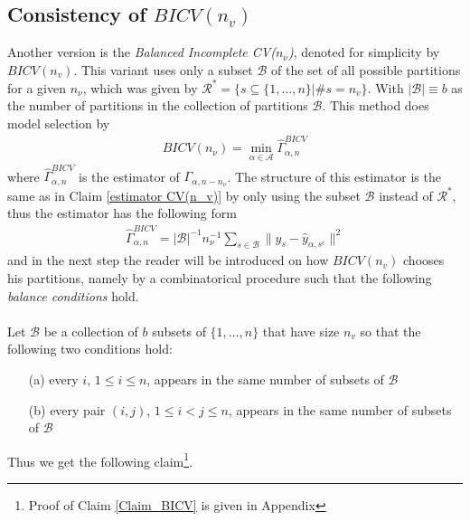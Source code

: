 \documentclass[Research_Module_ES.tex]{subfiles}
\begin{document}
\subsection{Consistency of $BICV(n_v)$}
Another version is the \textit{Balanced Incomplete CV($n_\nu$)}, denoted for simplicity by $BICV(n_v)$. This variant uses only a subset $\mathcal{B}$ of the set of all possible partitions for a given $n_\nu$, which was given by $\mathcal{R}^\ast= \{s\subseteq\{1,\dots,n\}|\# s=n_v\}$. With $|\mathcal{B}|\equiv b$ as the number of partitions in the collection of partitions $\mathcal{B}$. This method does model selection by 
\begin{align*}
	BICV(n_\nu)=\min_{\alpha\in\mathcal{A}}\hat{\Gamma}_{\alpha,n}^{BICV}
\end{align*}
where $\hat{\Gamma}_{\alpha,n}^{BICV}$ is the estimator of $\Gamma_{\alpha,n-n_\nu}$. The structure of this estimator is the same as in Claim \ref{estimator CV(n_v)} by only using the subset $\mathcal{B}$ instead of $\mathcal{R}^\ast$, thus the estimator has the following form
\begin{align*}
	\hat{\Gamma}_{\alpha,n}^{BICV}=|\mathcal{B}|^{-1}n_\nu^{-1}\sum_{s\in\mathcal{B}}\parallel y_s-\hat{y}_{\alpha,s^c}\parallel^2
\end{align*}
 and in the next step the reader will be introduced on how $BICV(n_v)$ chooses his partitions, namely by a combinatorical procedure such that the following \textit{balance conditions} hold.\\\\
Let $\mathcal{B}$ be a collection of $b$ subsets of $\{ 1,\dots,n\}$ that have size $n_v$ so that the following two conditions hold:
\begin{enumerate}
\item[(a)] every $i$, $1\le i \le n$, appears in the same number of subsets of $\mathcal{B}$
\item[(b)] every pair $(i,j)$, $1\le i < j \le n$, appears in the same number of subsets of $\mathcal{B}$
\end{enumerate}

Thus we get the following claim\footnote{Proof of Claim \ref{Claim_BICV} is given in Appendix }.
\end{document}
